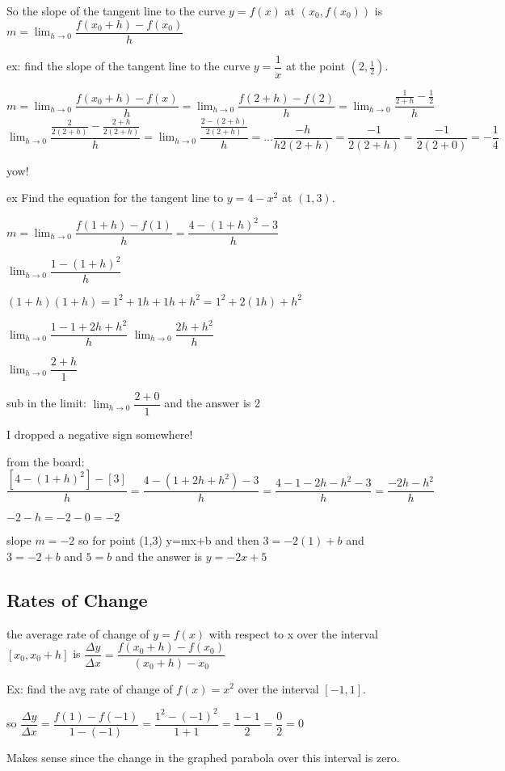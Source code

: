 \documentclass[12pt]{article}
\begin{document}
So the slope of the tangent line to the curve $y=f(x)$ at $(x_{0},f(x_{0}))$ is $m=\lim_{h\to0}\dfrac{f(x_{0}+h)-f(x_{0})}{h}$


ex: find the slope of the tangent line to the curve $y=\dfrac{1}{x}$ at the point $(2,\frac{1}{2})$.

$m = \lim_{h\to0}\dfrac{f(x_{0}+h)-f(x)}{h} = \lim_{h\to0}\dfrac{f(2+h)-f(2)}{h} =
\lim_{h\to0}\dfrac{\frac{1}{2+h}-\frac{1}{2}}{h}$
$\lim_{h\to0}\dfrac{\frac{2}{2(2+h)} - \frac{2+h}{2(2+h)}}{h} = \lim_{h\to0}\dfrac{\frac{2-(2+h)}{2(2+h)}}{h}
= ... \dfrac{-h}{h2(2+h)} = \dfrac{-1}{2(2+h)} = \dfrac{-1}{2(2+0)} = -\dfrac{1}{4}$

yow!

ex Find the equation for the tangent line to $y=4-x^{2}$ at $(1,3)$.

$m = \lim_{h\to0}\dfrac{f(1+h)-f(1)}{h} = \dfrac{4-(1+h)^{2}-3}{h}$

$\lim_{h\to0}\dfrac{1-(1+h)^{2}}{h}$

$(1+h)(1+h) = 1^2+1h+1h+h^2 = 1^{2} + 2(1h) + h^{2}$

$\lim_{h\to0}\dfrac{1-1+2h+h^{2}}{h}$
$\lim_{h\to0}\dfrac{2h+h^{2}}{h}$

$\lim_{h\to0}\dfrac{2+h}{1}$

sub in the limit:
$\lim_{h\to0}\dfrac{2+0}{1}$
and the answer is 2

I dropped a negative sign somewhere!

from the board:
$\dfrac{[4-(1+h)^{2}]-[3]}{h} = \dfrac{4-(1+2h+h^{2})-3}{h} = \dfrac{4-1-2h-h^{2}-3}{h} =
\dfrac{-2h-h^{2}}{h}$

$-2-h = -2-0 = -2$

slope $m=-2$ so for point (1,3) y=mx+b and then $3=-2(1)+b$ and $3=-2+b$ and $5=b$ 
and the answer is $y=-2x+5$

\subsection{Rates of Change}

the average rate of change of $y=f(x)$ with respect to x over the interval $[x_{0},x_{0}+h]$ is $\dfrac{\Delta
  y}{\Delta x} = \dfrac{f(x_{0}+h)-f(x_{0})}{(x_{0}+h)-x_{0}}$

Ex: find the avg rate of change of $f(x)=x^{2}$ over the interval $[-1,1]$.

so $\dfrac{\Delta y}{\Delta x} = \dfrac{f(1)-f(-1)}{1-(-1)} = \dfrac{1^{2}-(-1)^{2}}{1+1} = \dfrac{1-1}{2} =
\dfrac{0}{2} = 0$

Makes sense since the change in the graphed parabola over this interval is zero.
\end{document}
